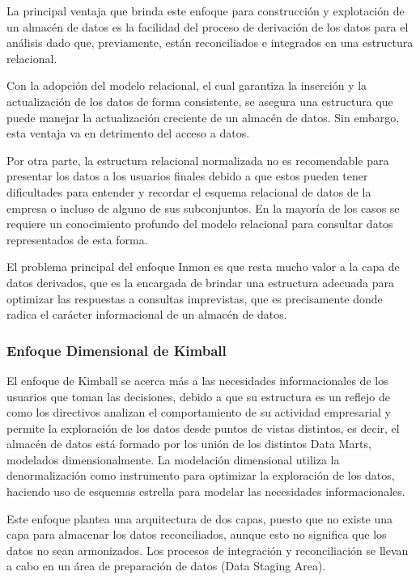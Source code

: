 La principal ventaja que brinda este enfoque para construcci\'on y explotaci\'on de un almacén de datos es la facilidad del proceso 
de derivaci\'on de los datos para el análisis dado que, previamente, est\'an reconciliados e integrados en una estructura relacional.

Con la adopci\'on del modelo relacional, el cual garantiza la inserci\'on y la actualización de los datos de forma consistente, se 
asegura una estructura que puede manejar la actualización creciente de un almacén de datos. Sin embargo, esta ventaja va en 
detrimento del acceso a datos. 

Por otra parte, la estructura relacional normalizada no es recomendable para presentar los datos a los usuarios finales debido 
a que estos pueden tener dificultades para entender y recordar el esquema relacional de datos de la empresa o incluso de alguno 
de sus subconjuntos. En la mayor\'ia de los casos se requiere un conocimiento profundo del modelo relacional para consultar 
datos representados de esta forma. 

El problema principal del enfoque Inmon es que resta mucho valor a la capa de datos derivados, que es la encargada de brindar 
una estructura adecuada para optimizar las respuestas a consultas imprevistas, que es precisamente donde radica el car\'acter 
informacional de un almacén de datos.

\subsubsection{Enfoque Dimensional de Kimball}

El enfoque de Kimball se acerca m\'as a las necesidades informacionales de los usuarios que toman las decisiones, debido a que su 
estructura es un reflejo de como los directivos analizan el comportamiento de su actividad empresarial y permite la exploraci\'on 
de los datos desde puntos de vistas distintos\cite{kimball2011data}, es decir, el almacén de datos est\'a formado por 
los uni\'on de los distintos Data Marts, modelados dimensionalmente. La modelación dimensional utiliza la denormalizaci\'on como 
instrumento para optimizar la exploraci\'on de los datos, haciendo uso de esquemas estrella para modelar las necesidades informacionales.

Este enfoque plantea una arquitectura de dos capas, puesto que no existe una capa para almacenar los datos reconciliados, aunque 
esto no significa que los datos no sean armonizados. Los procesos de integración y reconciliación se llevan a cabo en un \'area 
de preparaci\'on de datos (Data Staging Area). 

